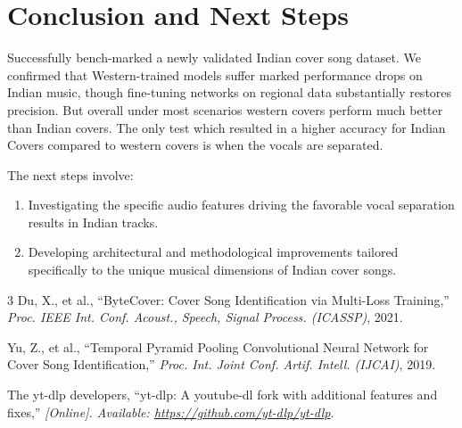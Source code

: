 \documentclass[conference]{IEEEtran}
\begin{document}
\section{Conclusion and Next Steps}
Successfully bench-marked a newly validated Indian cover song dataset. We confirmed that Western-trained models suffer marked performance drops on Indian music, though fine-tuning networks on regional data substantially restores precision. But overall under most scenarios western covers perform much better than Indian covers. The only test which resulted in a higher accuracy for Indian Covers compared to western covers is when the vocals are separated.

The next steps involve:
\begin{enumerate}
    \item Investigating the specific audio features driving the favorable vocal separation results in Indian tracks.
    \item Developing architectural and methodological improvements tailored specifically to the unique musical dimensions of Indian cover songs.
\end{enumerate}

\begin{thebibliography}{3}
Du, X., et al., ``ByteCover: Cover Song Identification via Multi-Loss Training,'' \textit{Proc. IEEE Int. Conf. Acoust., Speech, Signal Process. (ICASSP)}, 2021.

Yu, Z., et al., ``Temporal Pyramid Pooling Convolutional Neural Network for Cover Song Identification,'' \textit{Proc. Int. Joint Conf. Artif. Intell. (IJCAI)}, 2019.

The yt-dlp developers, ``yt-dlp: A youtube-dl fork with additional features and fixes,'' \textit{[Online]. Available: \url{https://github.com/yt-dlp/yt-dlp}}.
\end{thebibliography}
\end{document}
